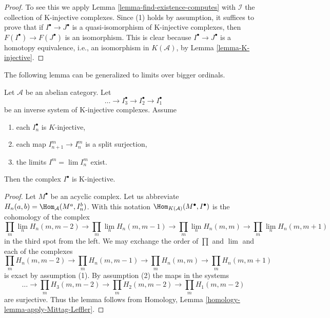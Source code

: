 \begin{proof}
To see this we apply
Lemma \ref{lemma-find-existence-computes}
with $\mathcal{I}$ the collection of K-injective complexes. Since (1)
holds by assumption, it suffices to prove that if $I^\bullet \to J^\bullet$
is a quasi-isomorphism of K-injective complexes, then
$F(I^\bullet) \to F(J^\bullet)$ is an isomorphism. This is clear because
$I^\bullet \to J^\bullet$ is a homotopy equivalence, i.e., an
isomorphism in $K(\mathcal{A})$, by
Lemma \ref{lemma-K-injective}.
\end{proof}

\noindent
The following lemma can be generalized to limits over bigger ordinals.

\begin{lemma}
\label{lemma-limit-K-injectives}
Let $\mathcal{A}$ be an abelian category. Let
$$
\ldots \to I_3^\bullet \to I_2^\bullet \to I_1^\bullet
$$
be an inverse system of K-injective complexes. Assume
\begin{enumerate}
\item each $I_n^\bullet$ is $K$-injective,
\item each map $I_{n + 1}^m \to I_n^m$ is a split surjection,
\item the limits $I^m = \lim I_n^m$ exist.
\end{enumerate}
Then the complex $I^\bullet$ is K-injective.
\end{lemma}

\begin{proof}
Let $M^\bullet$ be an acyclic complex. Let us abbreviate
$H_n(a, b) = \Hom_\mathcal{A}(M^a, I_n^b)$. With this notation
$\Hom_{K(\mathcal{A})}(M^\bullet, I^\bullet)$ is the cohomology
of the complex
$$
\prod_m \lim\limits_n H_n(m, m - 2)
\to
\prod_m \lim\limits_n H_n(m, m - 1)
\to
\prod_m \lim\limits_n H_n(m, m)
\to
\prod_m \lim\limits_n H_n(m, m + 1)
$$
in the third spot from the left.
We may exchange the order of $\prod$ and $\lim$ and each of the complexes
$$
\prod_m H_n(m, m - 2)
\to
\prod_m H_n(m, m - 1)
\to
\prod_m H_n(m, m)
\to
\prod_m H_n(m, m + 1)
$$
is exact by assumption (1). By assumption (2) the maps in the systems
$$
\ldots \to
\prod_m H_3(m, m - 2) \to
\prod_m H_2(m, m - 2) \to
\prod_m H_1(m, m - 2)
$$
are surjective. Thus the lemma follows from
Homology, Lemma \ref{homology-lemma-apply-Mittag-Leffler}.
\end{proof}

